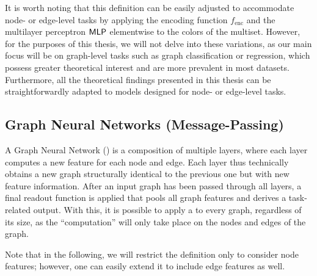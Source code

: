 It is worth noting that this definition can be easily adjusted to accommodate node- or edge-level tasks by applying the encoding function $f_\text{enc}$ and the multilayer perceptron $\textsf{MLP}$ elementwise to the colors of the multiset. However, for the purposes of this thesis, we will not delve into these variations, as our main focus will be on graph-level tasks such as graph classification or regression, which possess greater theoretical interest and are more prevalent in most datasets. Furthermore, all the theoretical findings presented in this thesis can be straightforwardly adapted to \wlnn models designed for node- or edge-level tasks.

\subsection{Graph Neural Networks (Message-Passing)}\label{sec:GNN Defintion}
A \textsf{Graph Neural Network} (\gnn) is a composition of multiple layers, where each layer computes a new feature for each node and edge. Each \gnn layer thus technically obtains a new graph structurally identical to the previous one but with new feature information. After an input graph has been passed through all layers, a final readout function is applied that pools all graph features and derives a task-related output. With this, it is possible to apply a \gnn to every graph, regardless of its size, as the ``computation'' will only take place on the nodes and edges of the graph.

Note that in the following, we will restrict the definition only to consider node features; however, one can easily extend it to include edge features as well.

